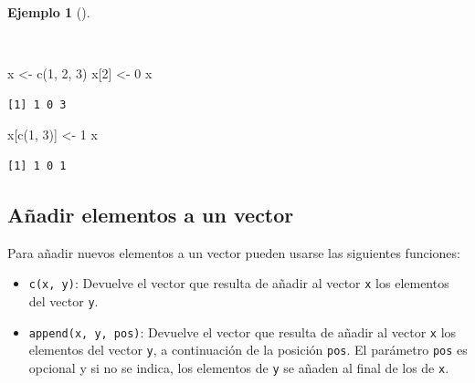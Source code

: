 \documentclass[
  a4paper,
]{scrreport}
\newenvironment{Shaded}{\begin{snugshade}}{\end{snugshade}}
\newcommand{\DecValTok}[1]{\textcolor[rgb]{0.68,0.00,0.00}{#1}}
\newcommand{\FunctionTok}[1]{\textcolor[rgb]{0.28,0.35,0.67}{#1}}
\newcommand{\NormalTok}[1]{\textcolor[rgb]{0.00,0.23,0.31}{#1}}
\newcommand{\OtherTok}[1]{\textcolor[rgb]{0.00,0.23,0.31}{#1}}
\providecommand{\tightlist}{%
  \setlength{\itemsep}{0pt}\setlength{\parskip}{0pt}}\usepackage{longtable,booktabs,array}
\theoremstyle{definition}
\theoremstyle{definition}
\newtheorem{example}{Ejemplo}[chapter]
\theoremstyle{remark}
\begin{document}
\begin{example}[]\protect\hypertarget{exm-modificacion-vectores}{}\label{exm-modificacion-vectores}

~

\begin{Shaded}
\begin{Highlighting}[]
\NormalTok{x }\OtherTok{\textless{}{-}} \FunctionTok{c}\NormalTok{(}\DecValTok{1}\NormalTok{, }\DecValTok{2}\NormalTok{, }\DecValTok{3}\NormalTok{)}
\NormalTok{x[}\DecValTok{2}\NormalTok{] }\OtherTok{\textless{}{-}} \DecValTok{0}
\NormalTok{x}
\end{Highlighting}
\end{Shaded}

\begin{verbatim}
[1] 1 0 3
\end{verbatim}

\begin{Shaded}
\begin{Highlighting}[]
\NormalTok{x[}\FunctionTok{c}\NormalTok{(}\DecValTok{1}\NormalTok{, }\DecValTok{3}\NormalTok{)] }\OtherTok{\textless{}{-}} \DecValTok{1}
\NormalTok{x}
\end{Highlighting}
\end{Shaded}

\begin{verbatim}
[1] 1 0 1
\end{verbatim}

\end{example}

\hypertarget{auxf1adir-elementos-a-un-vector}{%
\subsection{Añadir elementos a un
vector}\label{auxf1adir-elementos-a-un-vector}}

Para añadir nuevos elementos a un vector pueden usarse las siguientes
funciones:

\begin{itemize}
\tightlist
\item
  \texttt{c(x,\ y)}: Devuelve el vector que resulta de añadir al vector
  \texttt{x} los elementos del vector \texttt{y}.
\item
  \texttt{append(x,\ y,\ pos)}: Devuelve el vector que resulta de añadir
  al vector \texttt{x} los elementos del vector \texttt{y}, a
  continuación de la posición \texttt{pos}. El parámetro \texttt{pos} es
  opcional y si no se indica, los elementos de \texttt{y} se añaden al
  final de los de \texttt{x}.
\end{itemize}
\end{document}
